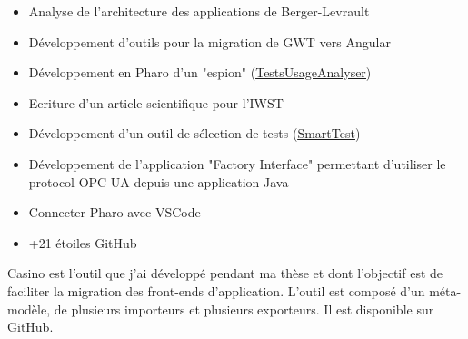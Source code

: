 \documentclass[10pt,a4paper,ragged2e,withhyper]{altacv}
\begin{document}
\divider

\begin{itemize}
\item Analyse de l’architecture des applications de Berger-Levrault
\item Développement d'outils pour la migration de GWT vers Angular
\end{itemize}

\divider

\begin{itemize}
  \item Développement en Pharo d'un "espion" (\href{https://badetitou.fr/projects/TUA/}{\color{blue}\underline{TestsUsageAnalyser}})
  \item Ecriture d'un article scientifique pour l'IWST
  \item Développement d'un outil de sélection de tests (\href{https://badetitou.fr/projects/SmartTest/}{\color{blue}\underline{SmartTest}})
\end{itemize}

\divider

\begin{itemize}
  \item Développement de l'application "Factory Interface" permettant d'utiliser le protocol OPC-UA depuis une application Java
\end{itemize}

\newpage


\begin{itemize}
\item Connecter Pharo avec VSCode
\item +21 étoiles GitHub
\end{itemize}

\divider


Casino est l'outil que j'ai développé pendant ma thèse et dont l'objectif est de faciliter la migration des front-ends d'application.
L'outil est composé d'un méta-modèle, de plusieurs importeurs et plusieurs exporteurs.
Il est disponible sur GitHub.
\end{document}
